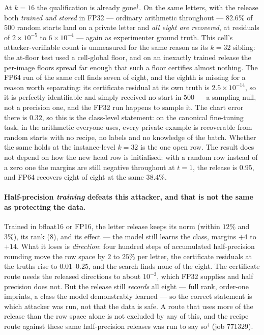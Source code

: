 At $k=16$ the qualification is already gone$^\dagger$. On the same letters,
with the release both \emph{trained and stored} in FP32 --- ordinary
arithmetic throughout --- $82.6\%$ of $500$ random starts land on a private
letter and \emph{all eight are recovered}, at residuals of $2\times10^{-5}$ to
$6\times10^{-4}$ --- again as experimenter ground truth. This cell's
attacker-verifiable count is unmeasured for the same reason as its $k=32$
sibling: the at-floor test used a cell-global floor, and on an inexactly
trained release the per-image floors spread far enough that such a floor
certifies almost nothing. The FP64 run of the same cell finds seven of eight, and the
eighth is missing for a reason worth separating: its certificate residual at
its own truth is $2.5\times10^{-14}$, so it is perfectly identifiable and
simply received no start in $500$ --- a sampling null, not a precision one,
and the FP32 run happens to sample it. The chart error there is $0.32$, so
this is the class-level statement: on the canonical fine-tuning task, in the
arithmetic everyone uses, every private example is recoverable from random
starts with no recipe, no labels and no knowledge of the batch. Whether the
same holds at the instance-level $k=32$ is the one open row. The result does
not depend on how the new head row is initialised: with a random row instead
of a zero one the margins are still negative throughout at $t=1$, the release
is $0.95$, and FP64 recovers eight of eight at the same $38.4\%$.

\paragraph{Half-precision \emph{training} defeats this attacker, and that is
not the same as protecting the data.} Trained in bfloat16 or FP16, the letter
release keeps its norm (within $12\%$ and $3\%$), its rank ($8$), and its
effect --- the model still learns the class, margins $+4$ to $+14$. What it
loses is \emph{direction}: four hundred steps of accumulated half-precision
rounding move the row space by $2$ to $25\%$ per letter, the certificate
residuals at the truths rise to $0.01$--$0.25$, and the search finds none of
the eight. The certificate route needs the released directions to about
$10^{-3}$, which FP32 supplies and half precision does not. But the release
still \emph{records} all eight --- full rank, order-one imprints, a class the
model demonstrably learned --- so the correct statement is which attacker was
run, not that the data is safe. A route that uses more of the release than the
row space alone is not excluded by any of this, and the recipe route against
these same half-precision releases was run to say so$^\dagger$ (job 771329).

